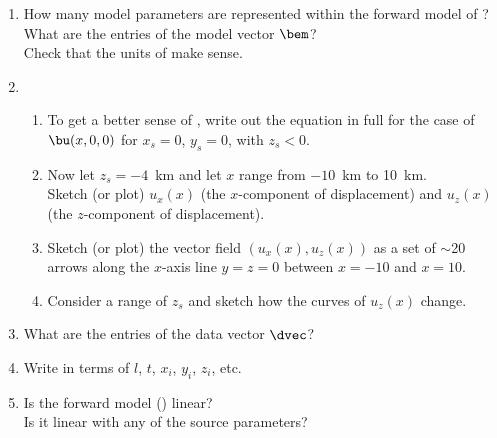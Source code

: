 \documentclass[11pt,titlepage,fleqn]{article}
\begin{document}
\begin{enumerate}
\item How many model parameters are represented within the forward model of ? \\
What are the entries of the model vector $\bem$? \\
Check that the units of  make sense.

\vspace{1cm}

\item 
\begin{enumerate}
\item To get a better sense of , write out the equation in full for the case of $\bu(x,0,0)$ for $x_s = 0$, $y_s = 0$, with $z_s < 0$.

\vspace{1cm}

\item Now let $z_s = -4$~km and let $x$ range from $-10$~km to 10~km. \\
Sketch (or plot) $u_x(x)$ (the $x$-component of displacement) and $u_z(x)$ (the $z$-component of displacement).

\vspace{4cm}

\item Sketch (or plot) the vector field $(u_x(x), u_z(x))$ as a set of $\sim$20 arrows along the $x$-axis line $y = z = 0$ between $x = -10$ and $x = 10$.

\vspace{4cm}

\item Consider a range of $z_s$ and sketch how the curves of $u_z(x)$ change.
\vspace{4cm}

\end{enumerate}

\item What are the entries of the data vector $\dvec$?

\vspace{1.5cm}

\item Write  in terms of $l$, $t$, $x_i$, $y_i$, $z_i$, etc.

\vspace{1cm}

\item Is the forward model () linear? \\
Is it linear with any of the source parameters?


\end{enumerate}
\end{document}
